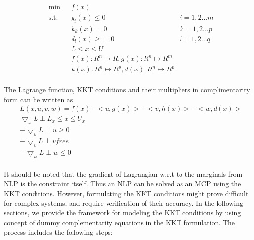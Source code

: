 \documentclass{article}
\begin{document}
\begin{equation}
\begin{aligned}
&	\min
& & f(x) \\
& \text{s.t.} & & 	 g_{i}(x) \leqslant 0	&	i = 1,2...m \\
& & &			h_{k}(x) = 0	 &	k = 1,2...p \\
& & &			d_{l}(x) \geqslant =0		&	l = 1,2...q \\
& & &			L \leq x \leq U \\
& & &			f(x): {\!R}^n \mapsto \!R , g(x): {\!R}^n \mapsto {\!R}^m\\
& & &			h(x): {\!R}^n \mapsto {\!R}^ p , d(x): {\!R}^n \mapsto {\!R}^ p\\
\end{aligned}
\end{equation}

\noindent The Lagrange function, KKT conditions and their multipliers in complimentarity form can be written as \\

\begin{equation}
\begin{aligned}
& L(x,u,v,w) = f(x) - <u,g(x)> - <v,h(x)> - <w,d(x)>  \\
& \bigtriangledown_x L  \perp L_x \leq x \leq U_x 	\\
& - \bigtriangledown_u L  \perp u \geq 0	\\
& -\bigtriangledown_v L  \perp v free	\\
& -\bigtriangledown_w L  \perp w \leq 0	\\
\end{aligned}
\end{equation}

\noindent It should be noted that the gradient of Lagrangian w.r.t to the marginals from NLP is the constraint itself. Thus an NLP can be solved as an MCP
using the KKT conditions. However, formulating the KKT conditions might prove difficult for complex systems, and require verification of their accuracy.
In the following sections, we provide the framework for modeling the KKT conditions  by using concept of dummy complementarity equations in the KKT formulation.
The process includes the following steps:
\end{document}

